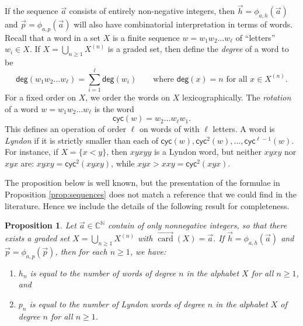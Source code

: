 \documentclass[11pt]{amsart}
\newtheorem{proposition}[theorem]{Proposition}
\theoremstyle{definition}
\numberwithin{equation}{section}
\def\NN{{\mathbb N}}
\def\CC{{\mathbb C}}
\newcommand{\veccard}{\overrightarrow{\operatorname{card}}}
\begin{document}
If the sequence $\vec{a}$ consists of entirely non-negative integers,
then $\vec{h} = \phi_{a, h}(\vec{a})$ and $\vec{p} = \phi_{a, p}(\vec{a})$ will also have combinatorial interpretation in terms of words.
Recall that a word in a set $X$ is a finite sequence $w = w_{1} w_{2} \ldots w_{\ell}$ of ``letters'' $w_{i} \in X$.  
If $X = \bigcup_{n \geq 1} X^{(n)}$ is a graded set, then define the \emph{degree} of a word to be
\[
\mathsf{deg}(w_1 w_2 \ldots w_{\ell}) = \sum_{i = 1}^{\ell} \mathsf{deg}(w_{i})
\qquad\text{where $\mathsf{deg}(x) = n$ for all $x \in X^{(n)}$}.
\]
For a fixed order on $X$, we order the words on $X$ lexicographically.  
The \emph{rotation} of a word $w = w_{1} w_{2} \ldots w_{\ell}$ is the word
\[
\mathsf{cyc}(w) =  w_{2} \ldots w_{\ell} w_{1}.
\]
This defines an operation of order $\ell$ on words of with $\ell$ letters.  
A word is \emph{Lyndon} if it is strictly smaller than each of $\mathsf{cyc}(w), \mathsf{cyc}^{2}(w), \ldots, \mathsf{cyc}^{\ell-1}(w)$.  
For instance, if $X = \{x < y\}$, then $xyxyy$ is a Lyndon word, but neither $xyxy$ nor $xyx$ are: $xyxy = \mathsf{cyc}^{2}(xyxy)$, while $xyx > xxy = \mathsf{cyc}^{2}(xyx)$.

The proposition below is well known, but the presentation of the
formulae in Proposition \ref{prop:sequences} does not match a reference that
we could find in the literature.  Hence we include the details of the
following result for completeness.

\begin{proposition}
\label{prop:combinatorialinterpretation}
Let $\vec{a} \in \CC^{\NN}$ contain of only nonnegative integers, so that there exists a graded set $X = \bigcup_{n \geq 1} X^{(n)}$ with $\veccard(X) = \vec{a}$.  
If $\vec{h} = \phi_{a, h}(\vec{a})$ and $\vec{p} = \phi_{a, p}(\vec{p})$, then for each $n \geq 1$, we have:
\begin{enumerate}[itemsep = 0.5em]
\item $h_n$ is equal to the number of words of degree $n$ in the alphabet $X$ for all $n \ge 1$, and 

\item $p_n$ is equal to the number of Lyndon words of degree $n$ in the alphabet $X$ of degree $n$ for all $n \ge 1$.

\end{enumerate}
\end{proposition}
\end{document}
